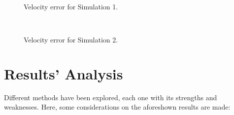 \documentclass[a4paper,12pt,oneside]{report}
\begin{document}
\begin{figure}[h]
  \centering
  \subfloat{} \quad
  \subfloat{}\\
  \caption{Velocity error for Simulation 1.}
  \label{velocity_1}
\end{figure}
\begin{figure}[h]
  \centering
  \subfloat{} \quad
  \subfloat{}\\
  \caption{Velocity error for Simulation 2.}
  \label{velocity_2}
\end{figure}
\section{Results' Analysis}
Different methods have been explored, each one with its strengths and weaknesses. Here, some considerations on the aforeshown results are made:
\end{document}
